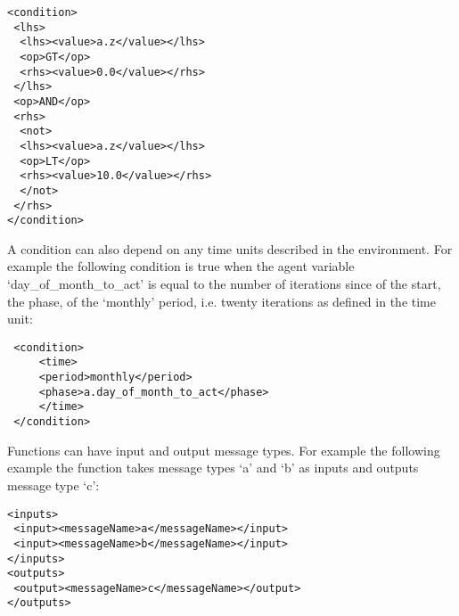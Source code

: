 \begin{mylisting}
\begin{verbatim}
<condition>
 <lhs>
  <lhs><value>a.z</value></lhs>
  <op>GT</op>
  <rhs><value>0.0</value></rhs>
 </lhs>
 <op>AND</op>
 <rhs>
  <not>
  <lhs><value>a.z</value></lhs>
  <op>LT</op>
  <rhs><value>10.0</value></rhs>
  </not>
 </rhs>
</condition>
\end{verbatim}
\end{mylisting}

A condition can also depend on any time units described in the environment. For
example the following condition is true when the agent variable
`day\_of\_month\_to\_act' is equal to the number of iterations since of the
start, the phase, of the `monthly' period, i.e. twenty iterations as defined in
the time unit:

\begin{mylisting}
\begin{verbatim}
 <condition>
     <time>
     <period>monthly</period>
     <phase>a.day_of_month_to_act</phase>
     </time>
 </condition>
\end{verbatim}
\end{mylisting}

% 
% 

Functions can have input and output message types. For example the following
example the function takes message types `a' and `b' as inputs and outputs
message type `c':

\begin{mylisting}
\begin{verbatim}
<inputs>
 <input><messageName>a</messageName></input>
 <input><messageName>b</messageName></input>
</inputs>
<outputs>
 <output><messageName>c</messageName></output>
</outputs>
\end{verbatim}
\end{mylisting}


